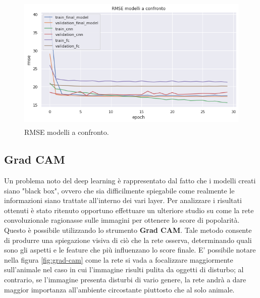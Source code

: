 \vspace{1cm}

\begin{figure}[h]
    \centering
    \includegraphics[width=13cm, height=6.5cm]{Plot/ALL_RMSE.png}
    \caption{RMSE modelli a confronto.}
    \label{fig:rmse-all}
\end{figure}


\subsection{Grad CAM}

Un problema noto del deep learning è rappresentato dal fatto che i modelli creati siano "black box", ovvero che sia difficilmente spiegabile come realmente le informazioni siano trattate all'interno dei vari layer. Per analizzare i risultati ottenuti è stato ritenuto opportuno effettuare un ulteriore studio su come la rete convoluzionale ragionasse sulle immagini per ottenere lo score di popolarità. Questo è possibile utilizzando lo strumento \textbf{Grad CAM}\cite{2019}. Tale metodo consente di produrre una spiegazione visiva di ciò che la rete osserva, determinando quali sono gli aspetti e le feature che più influenzano lo score finale. E' possibile notare nella figura \ref{fig:grad-cam} come la rete si vada a focalizzare maggiormente sull'animale nel caso in cui l'immagine risulti pulita da oggetti di disturbo; al contrario, se l'immagine presenta disturbi di vario genere, la rete andrà a dare maggior importanza all'ambiente circostante piuttosto che al solo animale.

\vspace{1cm}

